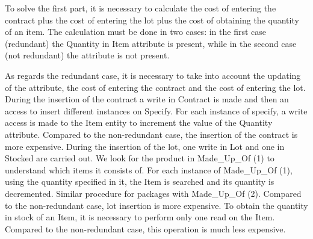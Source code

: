 To solve the first part, it is necessary to calculate the cost of entering the contract plus the cost of entering the lot plus the cost of obtaining the quantity of an item. The calculation must be done in two cases: in the first case (redundant) the Quantity in Item attribute is present, while in the second case (not redundant) the attribute is not present.

As regards the redundant case, it is necessary to take into account the updating of the attribute, the cost of entering the contract and the cost of entering the lot.
During the insertion of the contract a write in Contract is made and then an access to insert different instances on Specify. For each instance of specify, a write access is made to the Item entity to increment the value of the Quantity attribute. Compared to the non-redundant case, the insertion of the contract is more expensive.
During the insertion of the lot, one write in Lot and one in Stocked are carried out. We look for the product in Made_Up_Of (1) to understand which items it consists of. For each instance of Made_Up_Of (1), using the quantity specified in it, the Item is searched and its quantity is decremented. Similar procedure for packages with Made_Up_Of (2). Compared to the non-redundant case, lot insertion is more expensive.
To obtain the quantity in stock of an Item, it is necessary to perform only one read on the Item. Compared to the non-redundant case, this operation is much less expensive.

